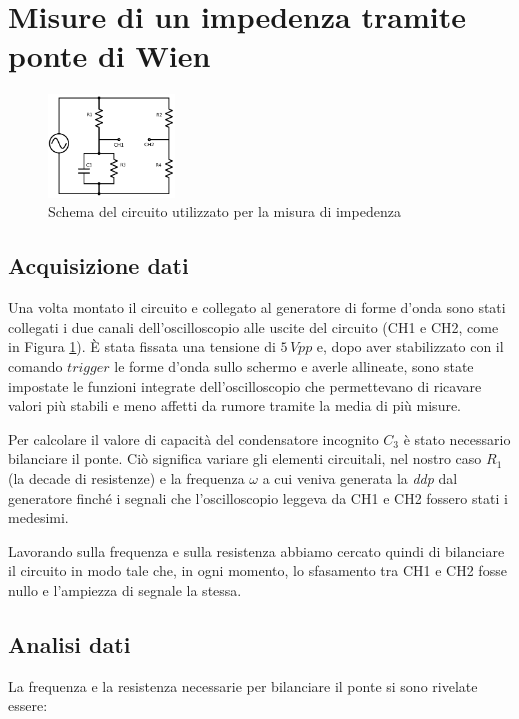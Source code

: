\section{Misure di un impedenza tramite ponte di Wien}

\begin{figure}
	\centering
    \includegraphics[width=0.30\textwidth]{schema1.pdf}
    \caption{Schema del circuito utilizzato per la misura di impedenza}
    \label{fig:circuito}
\end{figure}

\subsection{Acquisizione dati}
Una volta montato il circuito e collegato al generatore di forme d'onda sono stati collegati i due canali dell'oscilloscopio alle uscite del circuito (CH1 e CH2, come in Figura \ref{fig:circuito}). 
\`E stata fissata una tensione di $5\,Vpp$ e, dopo aver stabilizzato con il comando $trigger$ le forme d'onda sullo schermo e averle allineate, sono state impostate le funzioni integrate dell'oscilloscopio che permettevano di ricavare valori più stabili e meno affetti da rumore tramite la media di più misure.

Per calcolare il valore di capacità del condensatore incognito $C_3$ è stato necessario bilanciare il ponte. Ciò significa variare gli elementi circuitali, nel nostro caso $R_1$ (la decade di resistenze) e la frequenza $\omega$ a cui veniva generata la \emph{ddp} dal generatore finché i segnali che l'oscilloscopio leggeva da CH1 e CH2 fossero stati i medesimi.

Lavorando sulla frequenza e sulla resistenza abbiamo cercato quindi di bilanciare il circuito in modo tale che, in ogni momento, lo sfasamento tra CH1 e CH2 fosse nullo e l'ampiezza di segnale la stessa.

\subsection{Analisi dati}

La frequenza e la resistenza necessarie per bilanciare il ponte si sono rivelate essere:

